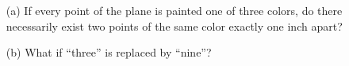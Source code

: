 \begin{enumerate}
\item[(a)] If every point of the plane is painted one of three colors,
do there necessarily exist two points of the same color exactly one
inch apart?
\item[(b)] What if ``three'' is replaced by ``nine''?
\end{enumerate}
